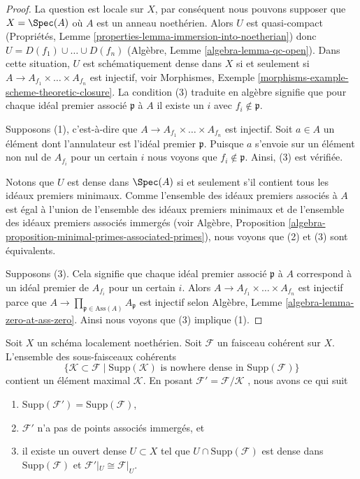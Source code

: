 \begin{proof}
La question est locale sur  $X$, par conséquent nous pouvons supposer que
 $X = \Spec(A)$  où  $A$  est un anneau noethérien. Alors  $U$  est
quasi-compact (Propriétés, Lemme  \ref{properties-lemma-immersion-into-noetherian}) donc  $U = D(f_1) \cup \ldots \cup D(f_n)$  (Algèbre, Lemme
 \ref{algebra-lemma-qc-open}). Dans cette situation,  $U$  est schématiquement dense dans
 $X$  si et seulement si  $A \to A_{f_1} \times \ldots \times A_{f_n}$  est injectif, voir Morphismes,
Exemple  \ref{morphisms-example-scheme-theoretic-closure}. La condition (3) traduite en algèbre signifie que pour
chaque idéal premier associé  $\mathfrak p$  à  $A$  il existe un
 $i$  avec  $f_i \not \in \mathfrak p$.

\medskip\noindent
Supposons (1), c'est-à-dire que  $A \to A_{f_1} \times \ldots \times A_{f_n}$  est injectif. Soit  $a \in A$
un élément dont l'annulateur est l'idéal premier  $\mathfrak p$. Puisque  $a$  s'envoie sur un
élément non nul de  $A_{f_i}$  pour un certain  $i$  nous voyons que
 $f_i \not \in \mathfrak p$. Ainsi, (3) est vérifiée.

\medskip\noindent
Notons que  $U$  est dense dans  $\Spec(A)$  si et seulement s'il contient
tous les idéaux premiers minimaux. Comme l'ensemble des idéaux premiers associés à
 $A$  est égal à l'union de l'ensemble des idéaux premiers minimaux et de
l'ensemble des idéaux premiers associés immergés (voir Algèbre, Proposition
 \ref{algebra-proposition-minimal-primes-associated-primes}), nous voyons que (2) et (3) sont équivalents.

\medskip\noindent
Supposons (3). Cela signifie que chaque idéal premier associé  $\mathfrak p$  à
 $A$  correspond à un idéal premier de  $A_{f_i}$  pour un certain  $i$.
Alors  $A \to A_{f_1} \times \ldots \times A_{f_n}$  est injectif parce que  $A \to \prod_{\mathfrak p \in \text{Ass}(A)} A_\mathfrak p$  est injectif selon Algèbre,
Lemme  \ref{algebra-lemma-zero-at-ass-zero}. Ainsi nous voyons que (3) implique (1).
\end{proof}

\begin{lemma}
\label{lemma-remove-embedded-points}
Soit  $X$  un schéma localement noethérien. Soit  $\mathcal{F}$  un faisceau
cohérent sur  $X$. L'ensemble des sous-faisceaux cohérents
$$
\{
\mathcal{K} \subset \mathcal{F}
\mid
\text{Supp}(\mathcal{K})\text{ is nowhere dense in }\text{Supp}(\mathcal{F})
\}
$$
contient un élément maximal  $\mathcal{K}$. En posant  $\mathcal{F}' = \mathcal{F}/\mathcal{K}$ , nous avons ce
qui suit
\begin{enumerate}
\item $\text{Supp}(\mathcal{F}') = \text{Supp}(\mathcal{F})$,
\item $\mathcal{F}'$  n’a pas de points associés immergés, et
\item il existe un ouvert dense  $U \subset X$  tel que  $U \cap \text{Supp}(\mathcal{F})$  est dense dans
 $\text{Supp}(\mathcal{F})$  et  $\mathcal{F}'|_U \cong \mathcal{F}|_U$.
\end{enumerate}
\end{lemma}

